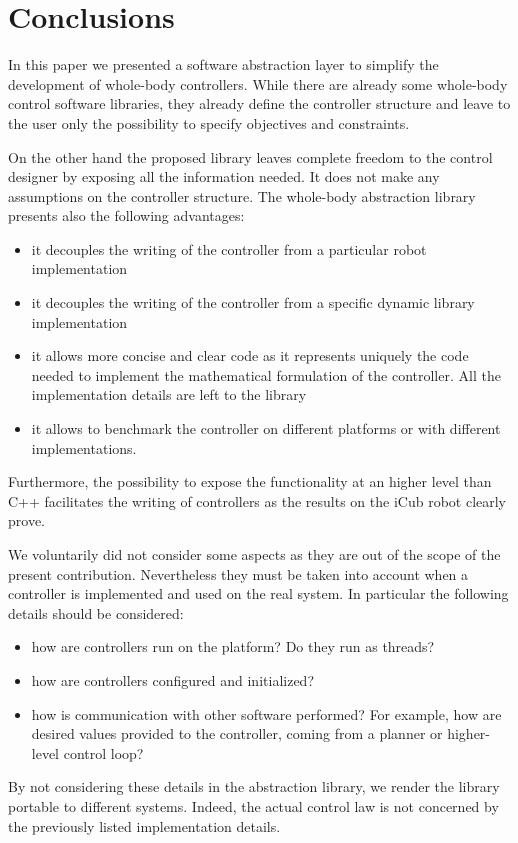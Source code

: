 \section{Conclusions}
\label{sec:conclusions}

In this paper we presented a software abstraction layer to simplify the development of whole-body controllers.
While there are already some whole-body control software libraries, they already define the controller structure and leave to the user only the possibility to specify objectives and constraints.

On the other hand the proposed library leaves complete freedom to the control designer by exposing all the information needed. It does not make any assumptions on the controller structure.
The whole-body abstraction library presents also the following advantages:
\begin{itemize}
    \item it decouples the writing of the controller from a particular robot implementation
    \item it decouples the writing of the controller from a specific dynamic library implementation
    \item it allows more concise and clear code as it represents uniquely the code needed to implement the mathematical formulation of the controller. All the implementation details are left to the library
    \item it allows to benchmark the controller on different platforms or with different implementations.
\end{itemize}
Furthermore, the possibility to expose the functionality at an higher level than C++ facilitates the writing of controllers as the results on the iCub robot clearly prove.

We voluntarily did not consider some aspects as they are out of the scope of the present contribution. 
Nevertheless they must be taken into account when a controller is implemented and used on the real system.
In particular the following details should be considered:
\begin{itemize}
    \item how are controllers run on the platform? Do they run as threads?
    \item how are controllers configured and initialized?
    \item how is communication with other software performed? For example, how are desired values provided to the controller, coming from a planner or higher-level control loop?
\end{itemize}
By not considering these details in the abstraction library, we render the library portable to different systems.
Indeed, the actual control law is not concerned by the previously listed implementation details.

